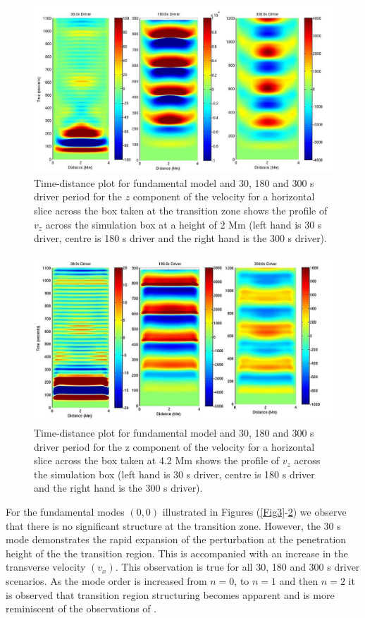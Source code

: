 \documentclass[preprint,authoryear,12pt]{elsarticle}
\begin{document}
\begin{figure}[h]
\includegraphics[scale=1]{imrescale/fig4_dt_30_180_300_0_horiz_2Mm.jpg}
\caption{Time-distance plot for fundamental model and 30, 180 and 300 s driver period for the $z$ component of the velocity for a horizontal slice across the box  taken at the transition zone shows  the profile of $v_{z}$ across the simulation box at a height of 2 Mm (left hand is 30 s driver, centre is 180 s driver and the right hand is the 300 s driver). }
\label{Fig5}
\end{figure}
\begin{figure}[h]
\includegraphics[scale=1]{imrescale/fig5_dt_30_180_300_0_horiz_4p2Mm.jpg}
\caption{Time-distance plot for fundamental model and 30, 180 and 300 s driver period for the z component of the velocity for a horizontal slice across the box  taken at 4.2 Mm shows  the profile of $v_{z}$ across the simulation box (left hand is 30 s driver, centre is 180 s driver and the right hand is the 300 s driver). }
\label{Fig6}
\end{figure}
For the fundamental modes $(0, 0)$  illustrated in Figures (\ref{Fig3}-\ref{Fig6})  we observe that there is no significant structure at the transition zone. However, the 30 s mode demonstrates the rapid expansion of the perturbation at the penetration height of the the transition region. This is accompanied with an increase in the transverse velocity $(v_x)$. This observation is true for all 30, 180 and 300 s driver scenarios. As the mode order is increased from $n=0$, to $n=1$ and then $n=2$ it is observed that transition region structuring becomes apparent and is more reminiscent of the observations of \citet{Malins2007A}.
\end{document}
